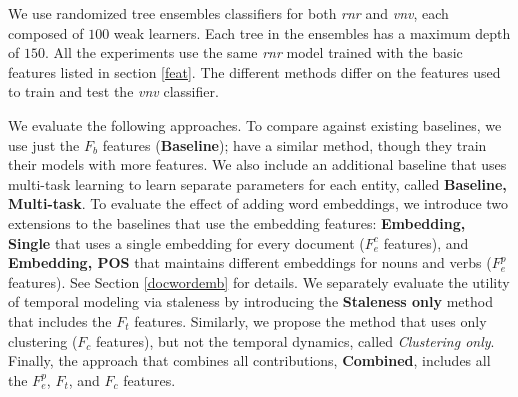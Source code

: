 \documentclass{article}
\begin{document}
We use randomized tree ensembles classifiers \cite{GEW06a} for both \emph{rnr} and \emph{vnv}, each composed of $100$ weak learners. Each tree in the ensembles has a maximum depth of $150$.
%
All the experiments use the same \emph{rnr} model trained with the basic features listed in section \ref{feat}.
The different methods differ on the features used to train and test the \emph{vnv} classifier.

We evaluate the following approaches.
  To compare against existing baselines, we use just the $F_b$ features ({\textbf{Baseline}}); \citet{jingang13, bellogin13} have a similar method, though they train their models with more features.
  We also include an additional baseline that uses multi-task learning \cite{Caruana93multitasklearning} to learn separate parameters for each entity, called {\textbf{Baseline, Multi-task}}.
  To evaluate the effect of adding word embeddings, we introduce two extensions to the baselines that use the embedding features: {\textbf{Embedding, Single}} that uses a single embedding for every document ($F_e^c$ features), and {\textbf{Embedding, POS}} that maintains different embeddings for nouns and verbs ($F_e^p$ features).
  See Section \ref{docwordemb} for details.
  We separately evaluate the utility of temporal modeling via staleness by introducing the {\textbf{Staleness only}} method that includes the $F_t$ features.
  Similarly, we propose the method that uses only clustering ($F_c$ features), but not the temporal dynamics, called {\textit{Clustering only}}.
  Finally, the approach that combines all contributions, {\textbf{Combined}}, includes all the $F_e^p$, $F_t$, and $F_c$ features.
\end{document}
